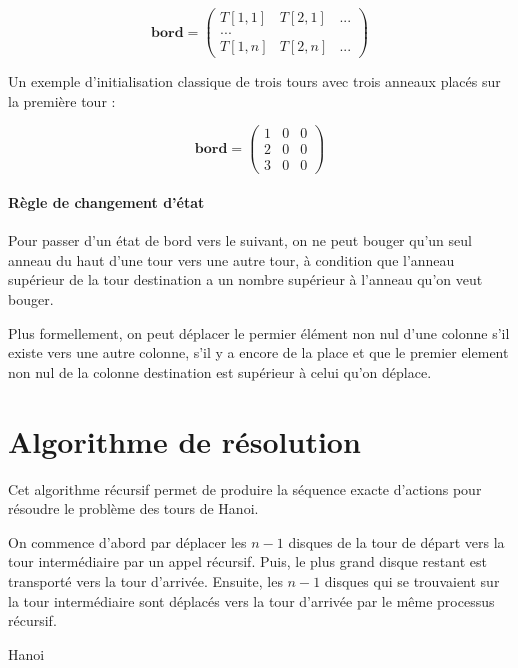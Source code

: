 $$
\mathbf{bord} = 
\begin{pmatrix}
    T[1, 1] & T[2, 1] & ... \\
    ... \\
    T[1, n] & T[2, n] & ...
\end{pmatrix}$$

Un exemple d'initialisation classique de trois tours avec trois anneaux placés sur la première tour :

$$
\mathbf{bord} = 
\begin{pmatrix}
    1 & 0 & 0 \\
    2 & 0 & 0 \\
    3 & 0 & 0 
\end{pmatrix}
$$

\paragraph{Règle de changement d'état}
Pour passer d'un état de bord vers le suivant, on ne peut bouger qu'un seul anneau du haut d'une tour vers une autre tour, à condition que l'anneau supérieur de la tour destination a un nombre supérieur à l'anneau qu'on veut bouger.
\par
Plus formellement, on peut déplacer le permier élément non nul d'une colonne s'il existe vers une autre colonne, s'il y a encore de la place et que le premier element non nul de la colonne destination est supérieur à celui qu'on déplace.

\section{Algorithme de résolution}
Cet algorithme récursif permet de produire la séquence exacte d'actions pour résoudre le problème des tours de Hanoi.
\par

On commence d'abord par déplacer les $n - 1$ disques de la tour de départ vers la tour intermédiaire par un appel récursif. Puis, le plus grand disque restant est transporté vers la tour d'arrivée. Ensuite, les $n - 1$ disques qui se trouvaient sur la tour intermédiaire sont déplacés vers la tour d'arrivée par le même processus récursif.

\begin{algorithm}[H]
    \SetAlgoLined
    \caption{Hanoi}
\end{algorithm}

